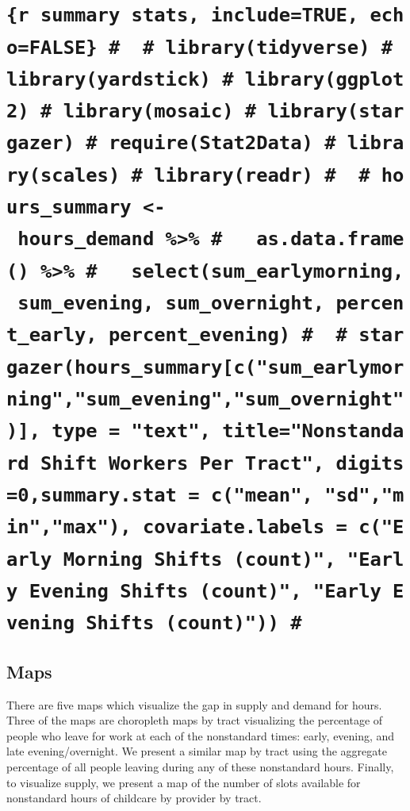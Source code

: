 \documentclass[10pt,letterpaper]{article}
\begin{document}
\section{\texorpdfstring{\texttt{\{r\ summary\ stats,\ include=TRUE,\ echo=FALSE\}\ \#\ \ \#\ library(tidyverse)\ \#\ library(yardstick)\ \#\ library(ggplot2)\ \#\ library(mosaic)\ \#\ library(stargazer)\ \#\ require(Stat2Data)\ \#\ library(scales)\ \#\ library(readr)\ \#\ \ \#\ hours\_summary\ \textless{}-\ hours\_demand\ \%\textgreater{}\%\ \#\ \ \ as.data.frame()\ \%\textgreater{}\%\ \#\ \ \ select(sum\_earlymorning,\ sum\_evening,\ sum\_overnight,\ percent\_early,\ percent\_evening)\ \#\ \ \#\ stargazer(hours\_summary{[}c("sum\_earlymorning","sum\_evening","sum\_overnight"){]},\ type\ =\ "text",\ title="Nonstandard\ Shift\ Workers\ Per\ Tract",\ digits=0,summary.stat\ =\ c("mean",\ "sd","min","max"),\ covariate.labels\ =\ c("Early\ Morning\ Shifts\ (count)",\ "Early\ Evening\ Shifts\ (count)",\ "Early\ Evening\ Shifts\ (count)"))\ \#}}{\{r summary stats, include=TRUE, echo=FALSE\} \#  \# library(tidyverse) \# library(yardstick) \# library(ggplot2) \# library(mosaic) \# library(stargazer) \# require(Stat2Data) \# library(scales) \# library(readr) \#  \# hours\_summary \textless{}- hours\_demand \%\textgreater{}\% \#   as.data.frame() \%\textgreater{}\% \#   select(sum\_earlymorning, sum\_evening, sum\_overnight, percent\_early, percent\_evening) \#  \# stargazer(hours\_summary{[}c("sum\_earlymorning","sum\_evening","sum\_overnight"){]}, type = "text", title="Nonstandard Shift Workers Per Tract", digits=0,summary.stat = c("mean", "sd","min","max"), covariate.labels = c("Early Morning Shifts (count)", "Early Evening Shifts (count)", "Early Evening Shifts (count)")) \#}}\label{r-summary-stats-includetrue-echofalse-librarytidyverse-libraryyardstick-libraryggplot2-librarymosaic-librarystargazer-requirestat2data-libraryscales-libraryreadr-hours_summary---hours_demand-as.data.frame-selectsum_earlymorning-sum_evening-sum_overnight-percent_early-percent_evening-stargazerhours_summarycsum_earlymorningsum_eveningsum_overnight-type-text-titlenonstandard-shift-workers-per-tract-digits0summary.stat-cmean-sdminmax-covariate.labels-cearly-morning-shifts-count-early-evening-shifts-count-early-evening-shifts-count}

\subsection{Maps}\label{maps-1}

There are five maps which visualize the gap in supply and demand for
hours. Three of the maps are choropleth maps by tract visualizing the
percentage of people who leave for work at each of the nonstandard
times: early, evening, and late evening/overnight. We present a similar
map by tract using the aggregate percentage of all people leaving during
any of these nonstandard hours. Finally, to visualize supply, we present
a map of the number of slots available for nonstandard hours of
childcare by provider by tract.
\end{document}
